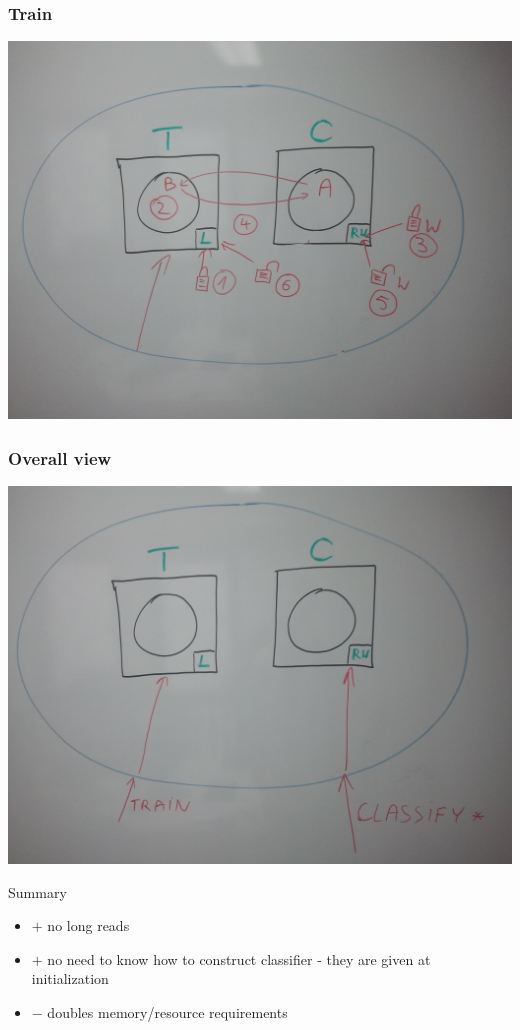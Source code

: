 \documentclass{beamer}
\begin{document}
\begin{frame}
\frametitle{Train}
\begin{center}
\includegraphics[scale=0.1]{train4.jpg} 
\end{center}
\end{frame}


\begin{frame}
\frametitle{Overall view}
\begin{center}
\includegraphics[scale=0.1]{overall.jpg} 
\end{center}
\end{frame}


\begin{frame}
\begin{block}{Summary}
\begin{itemize}
 \item $+$ no long reads
 \item $+$ no need to know how to construct classifier - they are given at initialization
 \item $-$ doubles memory/resource requirements
\end{itemize}
\end{block}
\end{frame}
\end{document}
